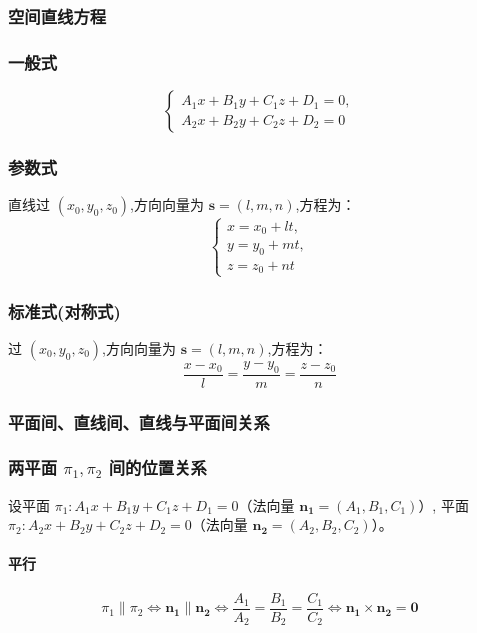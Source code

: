 \documentclass[UTF8]{ctexart}
\theoremstyle{remark}
\begin{document}
			\subsubsection{空间直线方程}
			\subsubsection*{一般式}
			\[ \begin{cases} 
				A_1x + B_1y + C_1z + D_1 = 0, \\
				A_2x + B_2y + C_2z + D_2 = 0 
			\end{cases} \]
			
			\subsubsection*{参数式}
			直线过 \((x_0, y_0, z_0)\),方向向量为 \(\boldsymbol{s} = (l, m, n)\),方程为：  
			\[ \begin{cases} 
				x = x_0 + lt, \\ 
				y = y_0 + mt, \\ 
				z = z_0 + nt 
			\end{cases} \]
			
			\subsubsection*{标准式(对称式)}
			过 \((x_0, y_0, z_0)\),方向向量为 \(\boldsymbol{s} = (l, m, n)\),方程为：  
			\[ \frac{x - x_0}{l} = \frac{y - y_0}{m} = \frac{z - z_0}{n} \]
			
			\subsubsection{平面间、直线间、直线与平面间关系}
			\subsubsection*{两平面 \(\pi_1, \pi_2\) 间的位置关系}
			设平面 \(\pi_1: A_1x + B_1y + C_1z + D_1 = 0\)（法向量 \(\boldsymbol{n_1} = (A_1, B_1, C_1)\)）,  
			平面 \(\pi_2: A_2x + B_2y + C_2z + D_2 = 0\)（法向量 \(\boldsymbol{n_2} = (A_2, B_2, C_2)\)）。  
			
			\paragraph{平行}  
			\[ \pi_1 \parallel \pi_2 \Leftrightarrow \boldsymbol{n_1} \parallel \boldsymbol{n_2} \Leftrightarrow \frac{A_1}{A_2} = \frac{B_1}{B_2} = \frac{C_1}{C_2} \Leftrightarrow \boldsymbol{n_1} \times \boldsymbol{n_2} = \boldsymbol{0} \]  
			
\end{document}
